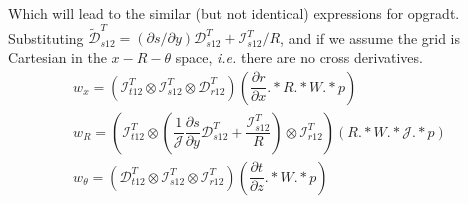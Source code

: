 \documentclass{kthreport}
\begin{document}
Which will lead to the similar (but not identical) expressions for opgradt. Substituting $\widetilde{\mathcal{D}}^{T}_{s12} = (\partial s/\partial y)\mathcal{D}^{T}_{s12} + \mathcal{I}^{T}_{s12}/R$, and if we assume the grid is Cartesian in the $x-R-\theta$ space, \textit{i.e.} there are no cross derivatives.
\begin{subequations}
	\begin{eqnarray}
		w_{x}	= (\mathcal{I}^{T}_{t12}\otimes\mathcal{I}^{T}_{s12}\otimes\mathcal{D}^{T}_{r12})(\dfrac{\partial r}{\partial x}.*R.*W.*p) \\
		w_{R}	= \left(\mathcal{I}^{T}_{t12}\otimes(\dfrac{1}{\mathcal{J}}\dfrac{\partial s}{\partial y}\mathcal{D}^{T}_{s12} + \dfrac{\mathcal{I}^{T}_{s12}}{R})\otimes\mathcal{I}^{T}_{r12}\right)(R.*W.*\mathcal{J}.*p) \\
		w_{\theta}	= (\mathcal{D}^{T}_{t12}\otimes\mathcal{I}^{T}_{s12}\otimes\mathcal{I}^{T}_{r12})(\dfrac{\partial t}{\partial z}.*W.*p)
	\end{eqnarray}
\end{subequations}
%
\end{document}
